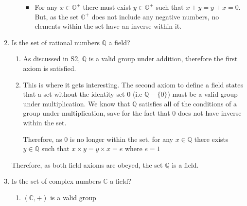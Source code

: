 \documentclass[11pt]{article}
\newcommand{\C}{{\mathbb{C}}}
\newcommand{\Q}{{\mathbb{Q}}}
\begin{document}
\begin{enumerate}[{\bf S1.}]
\begin{enumerate}
\begin{itemize}
                        \item For any $x\in\mathbb{O}^+$ there must exist $y\in\mathbb{O}^+$ such that $x + y = y + x = 0$. But, as 
                              the set $\mathbb{O}^+$ does not include any negative numbers, no elements within the set have an inverse
                              within it. 


                    \end{itemize}

              \end{enumerate}

        \newpage

        \item Is the set of rational numbers $\Q$ a field?
        
              \begin{enumerate}
                
                \item As discussed in S2, $\Q$ is a valid group under addition, therefore the first axiom is satisfied.
                
                \item This is where it gets interesting. The second axiom to define a field states that a set without the identity set 
                      $0$ (i.e $\Q - \{0\}$) must be a valid group under multiplication. We know that $\Q$ satisfies all of the 
                      conditions of a group under multiplication, save for the fact that $0$ does not have inverse within the set.

                      Therefore, as $0$ is no longer within the set, for any $x\in\Q$ there exists $y\in\Q$ such that $x\times y = y\times x = e$
                      where $e = 1$                      

              \end{enumerate}

              Therefore, as both field axioms are obeyed, the set $\Q$ is a field. 

        \item Is the set of complex numbers $\C$ a field?
        
        \begin{enumerate}
            
            \item $(\C, +)$ is a valid group 
            
            \begin{itemize}
                

\end{itemize}
\end{enumerate}
\end{enumerate}
\end{document}
